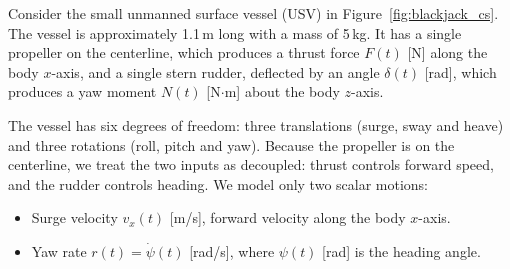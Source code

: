 \documentclass[11pt]{article}
\begin{document}
Consider the small unmanned surface vessel (USV) in Figure~\ref{fig:blackjack_cs}.  The vessel is approximately 1.1\,m long with a mass of 5\,kg.  It has a single propeller on the centerline, which produces a thrust force $F(t)$ [N] along the body $x$-axis, and a single stern rudder, deflected by an angle $\delta(t)$ [rad], which produces a yaw moment $N(t)$ [N$\cdot$m] about the body $z$-axis.

The vessel has six degrees of freedom: three translations (surge, sway and heave) and three rotations (roll, pitch and yaw).  Because the propeller is on the centerline, we treat the two inputs as decoupled: thrust controls forward speed, and the rudder controls heading.  We model only two scalar motions:
\begin{itemize}[nosep]
  \item Surge velocity $v_x(t)$ [m/s], forward velocity along the body $x$-axis.
  \item Yaw rate $r(t) = \dot{\psi}(t)$ [rad/s], where $\psi(t)$ [rad] is the heading angle.
\end{itemize}
\end{document}
